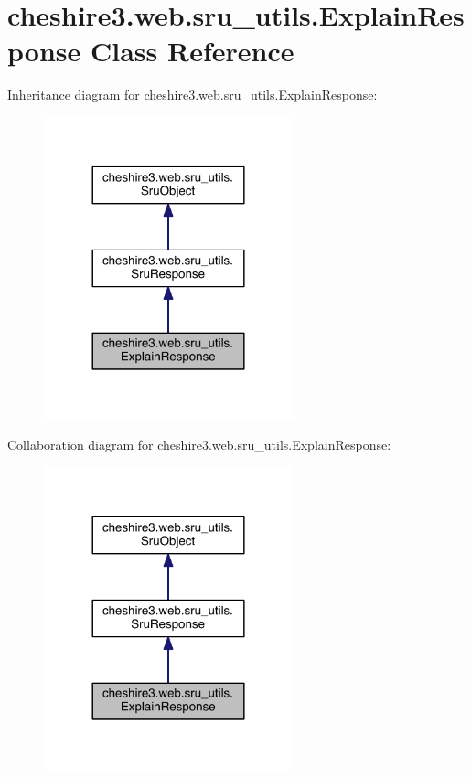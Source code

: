 \hypertarget{classcheshire3_1_1web_1_1sru__utils_1_1_explain_response}{\section{cheshire3.\-web.\-sru\-\_\-utils.\-Explain\-Response Class Reference}
\label{classcheshire3_1_1web_1_1sru__utils_1_1_explain_response}
}


Inheritance diagram for cheshire3.\-web.\-sru\-\_\-utils.\-Explain\-Response\-:
\nopagebreak
\begin{figure}[H]
\begin{center}
\leavevmode
\includegraphics[width=204pt]{classcheshire3_1_1web_1_1sru__utils_1_1_explain_response__inherit__graph}
\end{center}
\end{figure}


Collaboration diagram for cheshire3.\-web.\-sru\-\_\-utils.\-Explain\-Response\-:
\nopagebreak
\begin{figure}[H]
\begin{center}
\leavevmode
\includegraphics[width=204pt]{classcheshire3_1_1web_1_1sru__utils_1_1_explain_response__coll__graph}
\end{center}
\end{figure}
